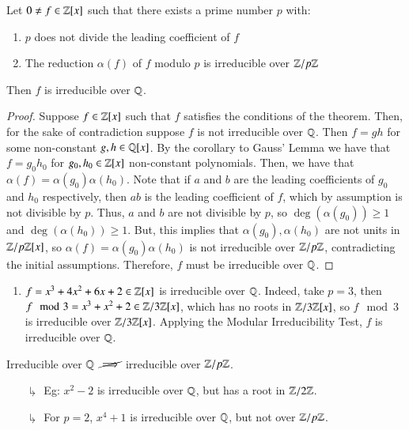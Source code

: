 \documentclass[12pt, a4paper, oneside, openright, titlepage]{book}
\begin{document}
\begin{namthm}
    Let $0 \neq f \in \mathbb Z[x]$ such that there exists a prime number $p$ with: \begin{enumerate}
        \item $p$ does not divide the leading coefficient of $f$
        \item The reduction $\alpha(f)$ of $f$ modulo $p$ is irreducible over $\mathbb Z/p\mathbb Z$
    \end{enumerate}
    Then $f$ is irreducible over $\mathbb Q$.
\end{namthm}
\begin{proof}
    Suppose $f \in \mathbb Z[x]$ such that $f$ satisfies the conditions of the theorem. Then, for the sake of contradiction suppose $f$ is not irreducible over $\mathbb Q$. Then $f = gh$ for some non-constant $g,h \in \mathbb Q[x]$. By the corollary to Gauss' Lemma we have that $f = g_0h_0$ for $g_0,h_0 \in \mathbb Z[x]$ non-constant polynomials. Then, we have that $\alpha(f) = \alpha(g_0)\alpha(h_0)$. Note that if $a$ and $b$ are the leading coefficients of $g_0$ and $h_0$ respectively, then $ab$ is the leading coefficient of $f$, which by assumption is not divisible by $p$. Thus, $a$ and $b$ are not divisible by $p$, so $\deg(\alpha(g_0)) \geq 1$ and $\deg(\alpha(h_0)) \geq 1$. But, this implies that $\alpha(g_0),\alpha(h_0)$ are not units in $\mathbb Z/p\mathbb Z[x]$, so $\alpha(f) = \alpha(g_0)\alpha(h_0)$ is not irreducible over $\mathbb Z/p\mathbb Z$, contradicting the initial assumptions. Therefore, $f$ must be irreducible over $\mathbb Q$.
\end{proof}

\begin{eg}
    \leavevmode
    \begin{enumerate}
        \item $f = x^3+4x^2+6x+2 \in \mathbb Z[x]$ is irreducible over $\mathbb Q$. Indeed, take $p = 3$, then $f\mod 3 = x^3+x^2+2 \in \mathbb Z/3\mathbb Z[x]$, which has no roots in $\mathbb Z/3\mathbb Z[x]$, so $f\mod 3$ is irreducible over $\mathbb Z/3\mathbb Z[x]$. Applying the Modular Irreducibility Test, $f$ is irreducible over $\mathbb Q$.
    \end{enumerate}
\end{eg}

\begin{rmk}
    Irreducible over $\mathbb Q$ $\cancel{\implies}$ irreducible over $\mathbb Z/p\mathbb Z$.
    \begin{enumerate}
        \item[$\drsh$] Eg: $x^2 - 2$ is irreducible over $\mathbb Q$, but has a root in $\mathbb Z/2\mathbb Z$. 
        \item[$\drsh$] For $p=2$, $x^4 + 1$ is irreducible over $\mathbb Q$, but not over $\mathbb Z/p\mathbb Z$.
    \end{enumerate}
\end{rmk}
\end{document}
